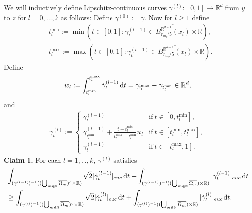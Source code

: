 \documentclass[a4paper,10pt]{article}
\numberwithin{equation}{section}
\newcommand{\R}{\mathbb{R}}
\newcommand{\N}{\mathbb{N}}
\newcommand{\di}{{\rm d}}
\begin{document}
We will inductively define Lipschitz-continuous curves $\gamma^{(l)}:[0,1] \to \R^d$ from $y$ to $z$ for $l=0, \ldots, k$ as follows:
Define $\gamma^{(0)}:= \gamma$. 
Now for $l \geq 1$ define 
\begin{align*}
    &t_l^{\min}:= \min(t \in [0,1]: \gamma^{(l-1)}_t \in \overline{B^{\R^{d-1}}_{r_{m_l}/5}(x_l)}\times \R), \\
    &t_l^{\max}:= \max(t \in [0,1]: \gamma^{(l-1)}_t \in \overline{B^{\R^{d-1}}_{r_{m_l}/5}(x_l)}\times \R). 
\end{align*}
Define
\begin{align}
    w_l:= \int_{t_l^{\min}}^{t_l^{\max}} \dot{\gamma}^{(l-1)}_t \, \di t = \gamma_{t_l^{\max}}- \gamma_{t_l^{\min}} \in \R^d, 
\end{align}
and \begin{align*}
     \gamma^{(l)}_t:= \left\{ \begin{array}{ll}
           \gamma^{(l-1)}_t & \mathrm{if}\ t \in [0, t_l^{\min}], \\
           \gamma^{(l-1)}_{t_l^{\min}} + \frac{t-t_l^{\min}}{t_l^{\max}-t_l^{\min}}w_l & \mathrm{if} \ t \in [t_l^{\min}, t_l^{\max}],\\
           \gamma^{(l-1)}_t & \mathrm{if}\ t \in [t_l^{\max}, 1].
        \end{array}\right.
\end{align*}
\textbf{Claim 1.} For each $l = 1, \ldots, k$, $\gamma^{(l)}$ satisfies 
\begin{align}\label{l-th_curve_preimage_length_estimate}
    &\int_{(\gamma^{(l-1)})^{-1}((\bigcup_{m\in \N}\overline{\Omega_m})^c\times \R)} \sqrt{2}|\dot{\gamma}^{(l-1)}_t|_{euc} \, \di t + \int_{(\gamma^{(l-1)})^{-1}((\bigcup_{m\in \N}\overline{\Omega_m})\times \R)} |\dot{\gamma}^{(l-1)}_t|_{euc} \, \di t \nonumber \\
    &\geq \int_{(\gamma^{(l)})^{-1}((\bigcup_{m\in \N}\overline{\Omega_m})^c\times \R)} \sqrt{2}|\dot{\gamma}^{(l)}_t|_{euc} \, \di t + \int_{(\gamma^{(l)})^{-1}((\bigcup_{m\in \N}\overline{\Omega_m})\times \R)} |\dot{\gamma}^{(l)}_t|_{euc} \, \di t.
\end{align}
\end{document}
